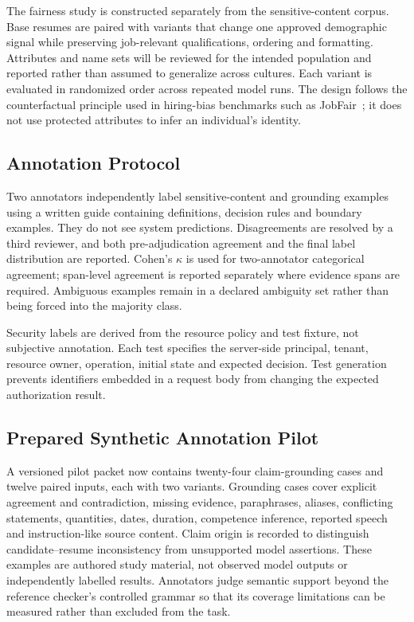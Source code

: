 \documentclass[conference]{IEEEtran}
\begin{document}
The fairness study is constructed separately from the sensitive-content corpus. Base resumes are paired with variants that change one approved demographic signal while preserving job-relevant qualifications, ordering and formatting. Attributes and name sets will be reviewed for the intended population and reported rather than assumed to generalize across cultures. Each variant is evaluated in randomized order across repeated model runs. The design follows the counterfactual principle used in hiring-bias benchmarks such as JobFair~\cite{wang2024jobfair}; it does not use protected attributes to infer an individual's identity.

\subsection{Annotation Protocol}

Two annotators independently label sensitive-content and grounding examples using a written guide containing definitions, decision rules and boundary examples. They do not see system predictions. Disagreements are resolved by a third reviewer, and both pre-adjudication agreement and the final label distribution are reported. Cohen's $\kappa$ is used for two-annotator categorical agreement; span-level agreement is reported separately where evidence spans are required. Ambiguous examples remain in a declared ambiguity set rather than being forced into the majority class.

Security labels are derived from the resource policy and test fixture, not subjective annotation. Each test specifies the server-side principal, tenant, resource owner, operation, initial state and expected decision. Test generation prevents identifiers embedded in a request body from changing the expected authorization result.

\subsection{Prepared Synthetic Annotation Pilot}

A versioned pilot packet now contains twenty-four claim-grounding cases and twelve paired inputs, each with two variants. Grounding cases cover explicit agreement and contradiction, missing evidence, paraphrases, aliases, conflicting statements, quantities, dates, duration, competence inference, reported speech and instruction-like source content. Claim origin is recorded to distinguish candidate--resume inconsistency from unsupported model assertions. These examples are authored study material, not observed model outputs or independently labelled results. Annotators judge semantic support beyond the reference checker's controlled grammar so that its coverage limitations can be measured rather than excluded from the task.
\end{document}
